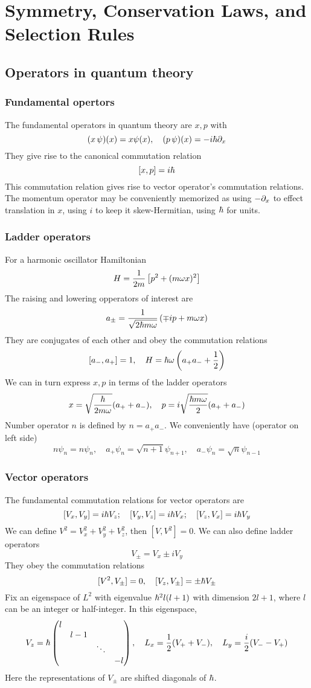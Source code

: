 \section{Symmetry, Conservation Laws, and Selection Rules}
\subsection{Operators in quantum theory}
\subsubsection{Fundamental opertors}
The fundamental operators in quantum theory are $x, p$ with 
\[ 
    (x\, \psi)(x) = x\psi(x), \quad (p\, \psi)(x) = -i\hbar \partial_{x}
\] 
They give rise to the canonical commutation relation 
\[ 
    [x, p] = i\hbar 
\] 
This commutation relation gives rise to vector operator's commutation relations. 
The momentum operator may be conveniently memorized as using $-\partial_{x}$ to effect 
translation in $x$, using $i$ to keep it skew-Hermitian, using $\hbar$ for units. 

\subsubsection{Ladder operators}
For a harmonic oscillator Hamiltonian 
\[ 
    H = \dfrac 1 {2m} \left[p^2 + (m\omega x)^2\right]
\] 
The raising and lowering opperators of interest are 
\[ 
    a_\pm = \dfrac 1 {\sqrt{2\hbar m \omega}}\left(\mp i p + m\omega x\right)
\] 
They are conjugates of each other and obey the commutation relations 
\[ 
    [a_-, a_+] = 1, \quad H = \hbar \omega \left(a_+a_- + \dfrac 1 2\right)
\] 
We can in turn express $x, p$ in terms of the ladder operators 
\[ 
    x = \sqrt{\dfrac{\hbar}{2m\omega}}(a_+ + a_-), \quad p = i \sqrt{\dfrac{\hbar m \omega}{2}}(a_+ + a_-)
\] 
Number operator $n$ is defined by $n = a_+a_-$. We conveniently have (operator on left side) 
\[ 
    n\psi_n = n\psi_n, \quad a_+\psi_n = \sqrt{n+1}\psi_{n+1}, \quad a_-\psi_n = \sqrt n \psi_{n-1}
\] 

\subsubsection{Vector operators}
The fundamental commutation relations for vector operators are 
\[ 
    [V_x, V_y] = i\hbar V_z; \quad [V_y, V_z] = i\hbar V_x; \quad [V_z, V_x] = i\hbar V_y 
\] 
We can define $V^2 = V_x^2 + V_y^2 + V_z^2$, then $[V, V^2]=0$. 
We can also define ladder operators 
\[ 
    V_\pm = V_x \pm i V_y 
\] 
They obey the commutation relations 
\[ 
    [V^2, V_\pm] = 0, \quad [V_z, V_\pm] = \pm \hbar V_\pm
\] 
Fix an eigenspace of $L^2$ with eigenvalue $\hbar^2l(l+1)$ with 
dimension $2l+1$, where $l$ can be an integer or half-integer.
In this eigenspace, 
\[ 
    V_z = \hbar \begin{pmatrix}
        l \\ & l-1 \\ &&\ddots \\ &&&-l 
    \end{pmatrix}, \quad
    L_x = \dfrac 1 2 (V_+ + V_-), \quad 
    L_y = \dfrac i {2}(V_- - V_+)
\] 
Here the representations of $V_\pm$ are shifted diagonals of $\hbar$. 

